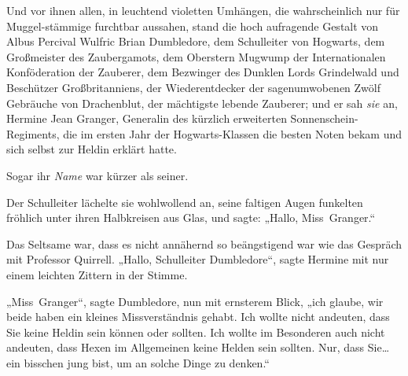 Und vor ihnen allen, in leuchtend violetten Umhängen, die wahrscheinlich nur für Muggel-stämmige furchtbar aussahen, stand die hoch aufragende Gestalt von Albus Percival Wulfric Brian Dumbledore, dem Schulleiter von Hogwarts, dem Großmeister des Zaubergamots, dem Oberstern Mugwump der Internationalen Konföderation der Zauberer, dem Bezwinger des Dunklen Lords Grindelwald und Beschützer Großbritanniens, der Wiederentdecker der sagenumwobenen Zwölf Gebräuche von Drachenblut, der mächtigste lebende Zauberer; und er sah \emph{sie} an, Hermine Jean Granger, Generalin des kürzlich erweiterten Sonnenschein-Regiments, die im ersten Jahr der Hogwarts-Klassen die besten Noten bekam und sich selbst zur Heldin erklärt hatte.

Sogar ihr \emph{Name} war kürzer als seiner.

Der Schulleiter lächelte sie wohlwollend an, seine faltigen Augen funkelten fröhlich unter ihren Halbkreisen aus Glas, und sagte:
„Hallo, Miss~Granger.“

Das Seltsame war, dass es nicht annähernd so beängstigend war wie das Gespräch mit Professor Quirrell.
„Hallo, Schulleiter Dumbledore“, sagte Hermine mit nur einem leichten Zittern in der Stimme.

„Miss~Granger“, sagte Dumbledore, nun mit ernsterem Blick, „ich glaube, wir beide haben ein kleines Missverständnis gehabt. Ich wollte nicht andeuten, dass Sie keine Heldin sein können oder sollten. Ich wollte im Besonderen auch nicht andeuten, dass Hexen im Allgemeinen keine Helden sein sollten. Nur, dass Sie…ein bisschen jung bist, um an solche Dinge zu denken.“

